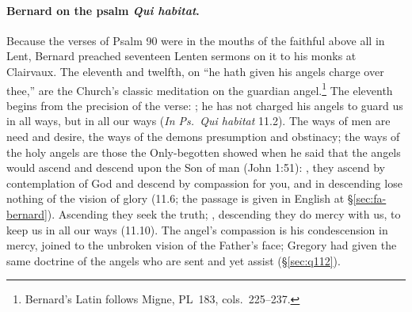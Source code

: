\paragraph{Bernard on the psalm \emph{Qui habitat}.} Because the verses of
Psalm 90 were in the mouths of the faithful above all in Lent, Bernard
preached seventeen Lenten sermons on it to his monks at Clairvaux. The
eleventh and twelfth, on ``he hath given his angels charge over thee,'' are
the Church's classic meditation on the guardian angel.\footnote{Bernard's
Latin follows Migne, PL~183, cols.~225--237.} The eleventh begins from the
precision of the verse: ; he has not charged his angels
to guard us in all ways, but in all our ways (\emph{In Ps.\ Qui habitat} 11.2).
The ways of men are need and desire, the ways of the demons presumption and
obstinacy; the ways of the holy angels are those the Only-begotten showed
when he said that the angels would ascend and descend upon the Son of man
(John 1:51): , they ascend by contemplation of God and descend by
compassion for you, and in descending lose nothing of the vision of glory
(11.6; the passage is given in English at \S\ref{sec:fa-bernard}).
Ascending they seek the truth; , descending they do mercy with us,
to keep us in all our ways (11.10). The
angel's compassion is his condescension in mercy, joined to the unbroken
vision of the Father's face; Gregory had given the same doctrine of the
angels who are sent and yet assist (\S\ref{sec:q112}).

